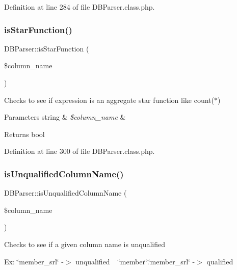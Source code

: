 Definition at line 284 of file D\+B\+Parser.\+class.\+php.

\hypertarget{classDBParser_a6a13c1cc9497af7dd0cb48e07b852947}{}\label{classDBParser_a6a13c1cc9497af7dd0cb48e07b852947} 
\subsubsection{\texorpdfstring{is\+Star\+Function()}{isStarFunction()}}
{\footnotesize\ttfamily D\+B\+Parser\+::is\+Star\+Function (\begin{DoxyParamCaption}\item[{}]{\$column\+\_\+name }\end{DoxyParamCaption})}

Checks to see if expression is an aggregate star function like count($\ast$)


\begin{DoxyParams}[1]{Parameters}
string & {\em \$column\+\_\+name} & \\
\hline
\end{DoxyParams}
\begin{DoxyReturn}{Returns}
bool 
\end{DoxyReturn}


Definition at line 300 of file D\+B\+Parser.\+class.\+php.

\hypertarget{classDBParser_a049f95bd692b0d34a72f88f92091af6f}{}\label{classDBParser_a049f95bd692b0d34a72f88f92091af6f} 
\subsubsection{\texorpdfstring{is\+Unqualified\+Column\+Name()}{isUnqualifiedColumnName()}}
{\footnotesize\ttfamily D\+B\+Parser\+::is\+Unqualified\+Column\+Name (\begin{DoxyParamCaption}\item[{}]{\$column\+\_\+name }\end{DoxyParamCaption})}

Checks to see if a given column name is unqualified

Ex\+: \char`\"{}member\+\_\+srl\char`\"{} -\/$>$ unqualified ~\newline
 \char`\"{}member\char`\"{}.\char`\"{}member\+\_\+srl\char`\"{} -\/$>$ qualified


